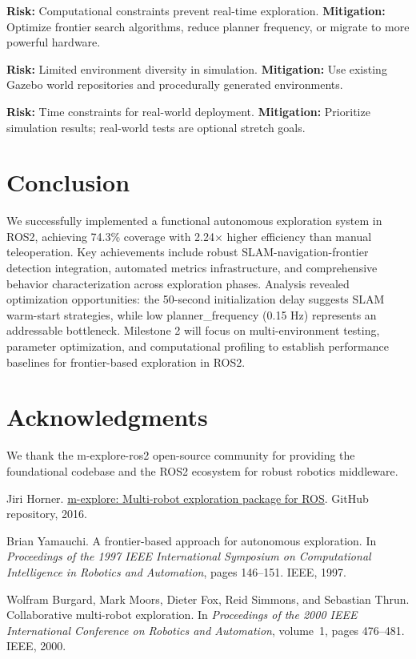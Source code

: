 \documentclass[conference]{IEEEtran}
\begin{document}
\textbf{Risk:} Computational constraints prevent real-time exploration. \textbf{Mitigation:} Optimize frontier search algorithms, reduce planner frequency, or migrate to more powerful hardware.

\textbf{Risk:} Limited environment diversity in simulation. \textbf{Mitigation:} Use existing Gazebo world repositories and procedurally generated environments.

\textbf{Risk:} Time constraints for real-world deployment. \textbf{Mitigation:} Prioritize simulation results; real-world tests are optional stretch goals.

\section{Conclusion}

We successfully implemented a functional autonomous exploration system in ROS2, achieving 74.3\% coverage with 2.24$\times$ higher efficiency than manual teleoperation. Key achievements include robust SLAM-navigation-frontier detection integration, automated metrics infrastructure, and comprehensive behavior characterization across exploration phases. Analysis revealed optimization opportunities: the 50-second initialization delay suggests SLAM warm-start strategies, while low planner\_frequency (0.15 Hz) represents an addressable bottleneck. Milestone 2 will focus on multi-environment testing, parameter optimization, and computational profiling to establish performance baselines for frontier-based exploration in ROS2.

\section*{Acknowledgments}

We thank the m-explore-ros2 open-source community for providing the foundational codebase and the ROS2 ecosystem for robust robotics middleware.


\begin{thebibliography}{1}

Jiri Horner.
\newblock \href{https://github.com/hrnr/m-explore}{m-explore: Multi-robot exploration package for ROS}.
\newblock GitHub repository, 2016.

Brian Yamauchi.
\newblock A frontier-based approach for autonomous exploration.
\newblock In \emph{Proceedings of the 1997 IEEE International Symposium on Computational Intelligence in Robotics and Automation}, pages 146--151. IEEE, 1997.

Wolfram Burgard, Mark Moors, Dieter Fox, Reid Simmons, and Sebastian Thrun.
\newblock Collaborative multi-robot exploration.
\newblock In \emph{Proceedings of the 2000 IEEE International Conference on Robotics and Automation}, volume~1, pages 476--481. IEEE, 2000.

\end{thebibliography}
\end{document}
